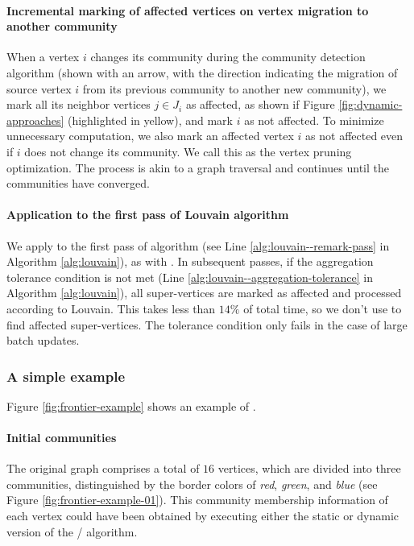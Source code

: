 \paragraph{Incremental marking of affected vertices on vertex migration to another community}

When a vertex $i$ changes its community during the community detection algorithm (shown with an arrow, with the direction indicating the migration of source vertex $i$ from its previous community to another new community), we mark all its neighbor vertices $j \in J_i$ as affected, as shown if Figure \ref{fig:dynamic-approaches} (highlighted in yellow), and mark $i$ as not affected. To minimize unnecessary computation, we also mark an affected vertex $i$ as not affected even if  $i$ does not change its community. We call this as the vertex pruning optimization. The process is akin to a graph traversal and continues until the communities have converged.

\paragraph{Application to the first pass of Louvain algorithm}

We apply \Fro{} to the first pass of \Lou{} algorithm (see Line \ref{alg:louvain--remark-pass} in Algorithm \ref{alg:louvain}), as with \Del{}. In subsequent passes, if the aggregation tolerance condition is not met (Line \ref{alg:louvain--aggregation-tolerance} in Algorithm \ref{alg:louvain}), all super-vertices are marked as affected and processed according to Louvain. This takes less than $14\%$ of total time, so we don't use \Fro{} to find affected super-vertices. The tolerance condition only fails in the case of large batch updates.


\subsubsection{A simple example}

Figure \ref{fig:frontier-example} shows an example of \Fro{}.

\paragraph{Initial communities}

The original graph comprises a total of $16$ vertices, which are divided into three communities, distinguished by the border colors of \textit{red}, \textit{green}, and \textit{blue} (see Figure \ref{fig:frontier-example-01}). This community membership information of each vertex could have been obtained by executing either the static or dynamic version of the \Lou{}/\LPA{} algorithm.

